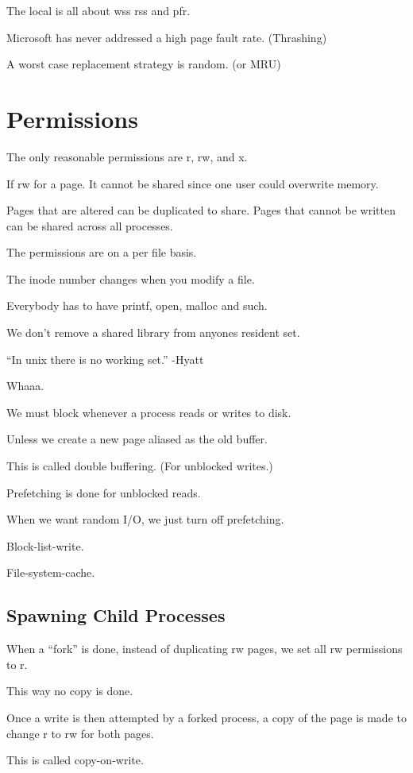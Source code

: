 \documentclass{article}
\begin{document}
The local is all about wss rss and pfr.

Microsoft has never addressed a high page fault rate. (Thrashing)

A worst case replacement strategy is random. (or MRU)

\section*{Permissions}

The only reasonable permissions are r, rw, and x.

If rw for a page. It cannot be shared since one user could overwrite memory.

Pages that are altered can be duplicated to share. Pages that cannot be written can be shared across all processes.

The permissions are on a per file basis.

The inode number changes when you modify a file.

Everybody has to have printf, open, malloc and such.

We don't remove a shared library from anyones resident set.

``In unix there is no working set.'' -Hyatt

Whaaa.

We must block whenever a process reads or writes to disk.

Unless we create a new page aliased as the old buffer.

This is called double buffering. (For unblocked writes.)

Prefetching is done for unblocked reads.

When we want random I/O, we just turn off prefetching.

Block-list-write.

File-system-cache.

\subsection*{Spawning Child Processes}

When a ``fork'' is done, instead of duplicating rw pages, we set all rw permissions to r.

This way no copy is done.

Once a write is then attempted by a forked process, a copy of the page is made to change r to rw for both pages.

This is called copy-on-write.
\end{document}
